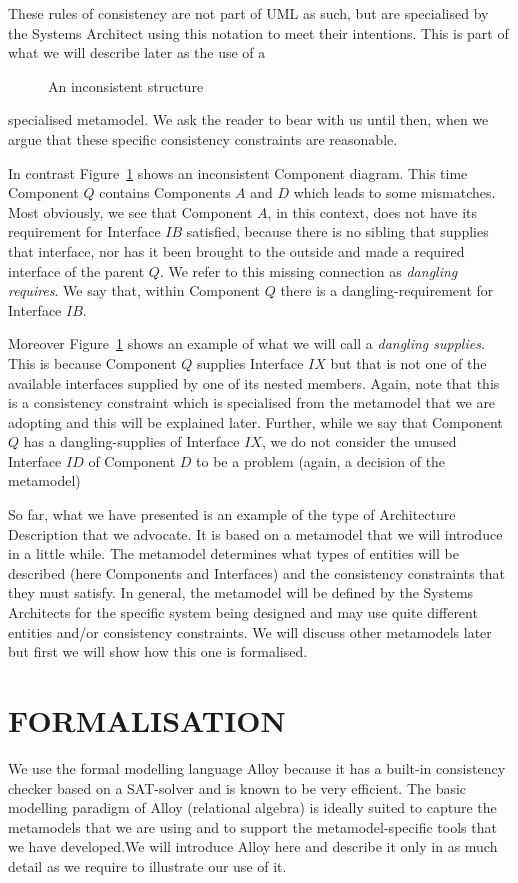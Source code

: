 \documentclass[a4paper,twoside]{article}
\begin{document}
These rules of consistency are not part of UML as such, but are specialised by the Systems Architect using this notation to meet their intentions. This is part of what we will describe later as the use of a %
\begin{figure}[!h]
  \centering
   {}
  \caption{An inconsistent structure}
  \label{fig:fig2}
\end{figure}
%
specialised metamodel. We ask the reader to bear with us until then, when we argue that these specific consistency constraints are reasonable.

In contrast Figure~\ref{fig:fig2} shows an inconsistent Component diagram. This time Component $Q$ contains Components $A$ and $D$ which leads to some mismatches. Most obviously, we see that Component $A$, in this context, does not have its requirement for Interface $IB$ satisfied, because there is no sibling that supplies that interface, nor has it been brought to the outside and made a required interface of the parent $Q$. We refer to this missing connection as {\em dangling requires}. We say that, within Component $Q$ there is a dangling-requirement for Interface $IB$.

Moreover Figure~\ref{fig:fig2} shows an example of what we will call a {\em dangling supplies}. This is because Component $Q$ supplies Interface $IX$ but that is not one of the available interfaces supplied by one of its nested members. Again, note that this is a consistency constraint which is specialised from the metamodel that we are adopting and this will be explained later. Further, while we say that Component $Q$ has a dangling-supplies of Interface $IX$, we do not consider the unused Interface $ID$ of Component $D$ to be a problem (again, a decision of the metamodel) 

So far, what we have presented is an example of the type of Architecture Description that we advocate. It is based on a metamodel that we will introduce in a little while. The metamodel determines what types of entities will be described (here Components and Interfaces) and the consistency constraints that they must satisfy. In general, the metamodel will be defined by the Systems Architects for the specific system being designed and may use quite different entities and/or consistency constraints. We will discuss other metamodels later but first we will show how this one is formalised.

\section{\uppercase{Formalisation}}
\label{sec:formalisation}
\noindent We use the formal modelling language Alloy \cite{Alloy} because it has a built-in consistency checker based on a SAT-solver and is known to be very efficient. The basic modelling paradigm of Alloy (relational algebra) is ideally suited to capture the metamodels that we are using and to support the metamodel-specific tools that we have developed.We will introduce Alloy here and describe it only in as much detail as we require to illustrate our use of it.
\end{document}
